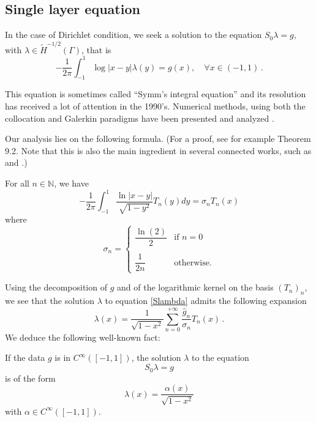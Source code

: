 \documentclass[a4paper]{article}
\begin{document}
\subsection{Single layer equation}

In the case of Dirichlet condition, we seek a solution to the equation $S_0\lambda = g$, with $\lambda \in \tilde{H}^{-1/2}(\Gamma)$, that is
\begin{equation}
-\frac{1}{2\pi}\int_{-1}^{1} \log|x-y| \lambda(y) = g(x), \quad \forall x\in (-1,1)\,.\label{Slambda}
\end{equation} 

This equation is sometimes called ``Symm's integral equation'' and its resolution has received a lot of attention in the 1990's. Numerical methods, using both the collocation and Galerkin paradigms have been presented and analyzed \cite{atkinson1991numerical,yan1988integral,yan1990cosine,sloan1992collocation,yan1989mesh}. 


Our analysis lies on the following formula. (For a proof, see for example \cite{mason2002chebyshev} Theorem 9.2. Note that this is also the main ingredient in several connected works, such as  \cite{bruno2012second} and \cite{jiang2004second}.)

\begin{Lem}
For all $n\in \mathbb{N}$, we have
	\[-\frac{1}{2\pi}\int_{-1}^{1} \frac{\ln|x-y|}{\sqrt{1 - y^2}}T_n(y)dy = \sigma_n T_n(x)\]
	where
	\[\sigma_n = \begin{cases}
	\dfrac{\ln(2)}{2} & \text{if } n=0\\
	\\
	\dfrac{1}{2n} & \text{otherwise}.
	\end{cases}\]
	\label{STn}
\end{Lem}

Using the decomposition of $g$ and of the logarithmic kernel on the basis $(T_n)_n$, we see that the solution $\lambda$ to equation \eqref{Slambda} admits the following expansion 
\begin{equation}
\lambda(x) = \frac{1}{\sqrt{1-x^2}}\sum_{n=0}^{+ \infty} \frac{\hat{g}_n}{\sigma_n} T_n(x)\,.
\label{expansionLambda}
\end{equation}
We deduce the following well-known fact:
\begin{Cor}
	\label{CorSingularity}
	If the data $g$ is in $C^{\infty}([-1,1])$, the solution $\lambda$ to the equation 
	\[S_0\lambda = g\]
	is of the form 
	\[\lambda(x) = \dfrac{\alpha(x)}{\sqrt{1-x^2}}\]
	with $\alpha \in C^{\infty}([-1,1])$.  
\end{Cor}
\end{document}

